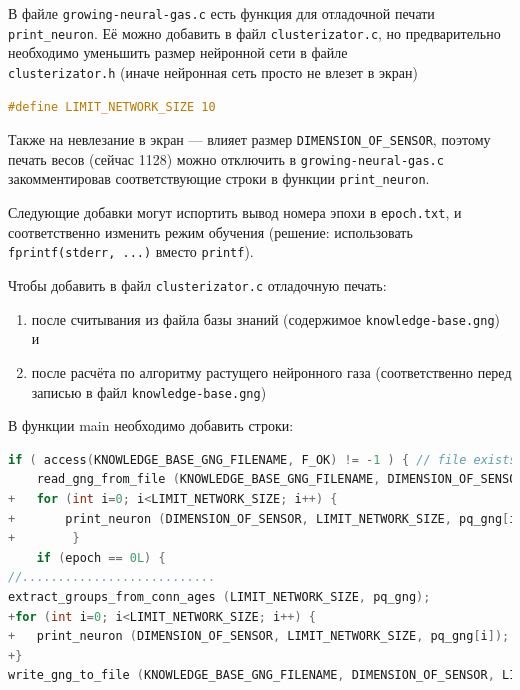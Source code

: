 \documentclass[unicode, 12pt, a4paper,oneside,fleqn]{article}
\begin{document}
В файле \verb'growing-neural-gas.c' есть функция для отладочной печати
\verb'print_neuron'.  Её можно добавить в файл \verb'clusterizator.c',
но предварительно необходимо уменьшить размер нейронной сети в файле\\
\verb'clusterizator.h' (иначе нейронная сеть просто не влезет в экран)

\begin{lstlisting}[language=C,
  caption={Файл clusterizator.h},
  captionpos=b,
  label={network:size:code}]
#define LIMIT_NETWORK_SIZE 10
\end{lstlisting}

Также на невлезание в экран --- влияет размер
\verb'DIMENSION_OF_SENSOR', поэтому печать весов (сейчас 1128) можно
отключить в \verb'growing-neural-gas.c' закомментировав
соответствующие строки в функции \verb'print_neuron'.



Следующие добавки могут испортить вывод номера эпохи в
\verb'epoch.txt', и соответственно изменить режим обучения
(решение: использовать\\
\verb'fprintf(stderr, ...)' вместо \verb'printf').

Чтобы добавить в файл \verb'clusterizator.c' отладочную печать:
\begin{enumerate}
\item после считывания из файла базы знаний (содержимое
  \verb'knowledge-base.gng') и
\item после расчёта по алгоритму растущего нейронного газа
  (соответственно перед записью в файл \verb'knowledge-base.gng')
\end{enumerate}
В функции main необходимо добавить строки:

\begin{lstlisting}[language=C,
  caption={Файл clusterizator.c},
  captionpos=b,
  label={debug:print:code},
  linewidth=16.5cm]
if ( access(KNOWLEDGE_BASE_GNG_FILENAME, F_OK) != -1 ) { // file exists
	read_gng_from_file (KNOWLEDGE_BASE_GNG_FILENAME, DIMENSION_OF_SENSOR, LIMIT_NETWORK_SIZE, pq_gng);
+	for (int i=0; i<LIMIT_NETWORK_SIZE; i++) {
+		print_neuron (DIMENSION_OF_SENSOR, LIMIT_NETWORK_SIZE, pq_gng[i]);
+        }
	if (epoch == 0L) {
//...........................
extract_groups_from_conn_ages (LIMIT_NETWORK_SIZE, pq_gng);
+for (int i=0; i<LIMIT_NETWORK_SIZE; i++) {
+	print_neuron (DIMENSION_OF_SENSOR, LIMIT_NETWORK_SIZE, pq_gng[i]);
+}
write_gng_to_file (KNOWLEDGE_BASE_GNG_FILENAME, DIMENSION_OF_SENSOR, LIMIT_NETWORK_SIZE, pq_gng);
\end{lstlisting}
\end{document}
